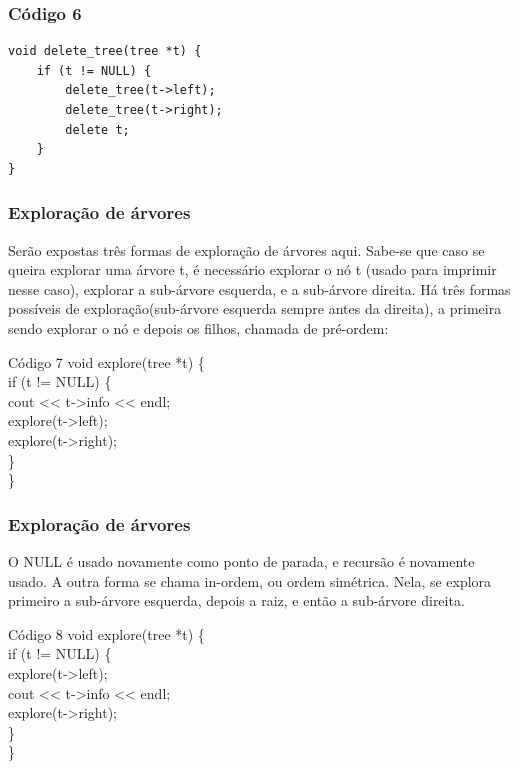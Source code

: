 \documentclass{beamer}
\begin{document}
	\begin{frame}[fragile]
	\frametitle{Código 6}
		\begin{lstlisting}
void delete_tree(tree *t) {
    if (t != NULL) {
        delete_tree(t->left);
        delete_tree(t->right);
        delete t;
    }
}
		\end{lstlisting}
	\end{frame}

	\begin{frame}
	\frametitle{Exploração de árvores}
		Serão expostas três formas de exploração de árvores aqui.
		Sabe-se que caso se queira explorar uma árvore t, é necessário
		explorar o nó t (usado para imprimir nesse caso), explorar a
		sub-árvore esquerda, e a sub-árvore direita. Há três formas
		possíveis de exploração(sub-árvore esquerda sempre antes da
		direita), a primeira sendo explorar o nó e depois os filhos,
		chamada de pré-ordem:
		\begin{block}{Código 7}
		\hspace{10 pt} void explore(tree *t) \{\\
		\hspace{20 pt} if (t != NULL) \{\\
		\hspace{30 pt} cout << t->info << endl;\\
		\hspace{30 pt} explore(t->left);\\
		\hspace{30 pt} explore(t->right);\\
		\hspace{20 pt} \}\\
		\hspace{10 pt} \}
		\end{block}
	\end{frame}

	\begin{frame}
	\frametitle{Exploração de árvores}
		O NULL é usado novamente como ponto de parada, e
		recursão é novamente usado. A outra forma se chama
		in-ordem, ou ordem simétrica. Nela, se explora primeiro a
		sub-árvore esquerda, depois a raiz, e então a sub-árvore direita.
		\begin{block}{Código 8}
		\hspace{10 pt} void explore(tree *t) \{\\
		\hspace{20 pt} if (t != NULL) \{\\
		\hspace{30 pt} explore(t->left);\\
		\hspace{30 pt} cout << t->info << endl;\\
		\hspace{30 pt} explore(t->right);\\
		\hspace{20 pt} \}\\
		\hspace{10 pt} \}
		\end{block}
	\end{frame}
\end{document}

